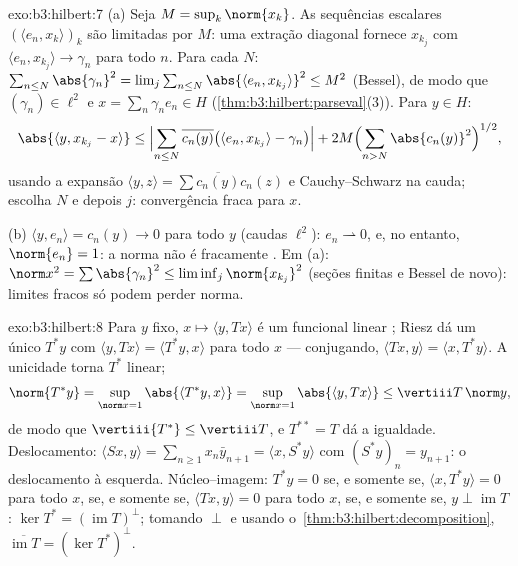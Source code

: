 \begin{solution}{exo:b3:hilbert:7}
(a) Seja $M = \sup_k\norm{x_k}$. As sequências escalares
$(\langle e_n, x_k\rangle)_k$ são limitadas por $M$: uma extração
diagonal fornece $x_{k_j}$ com $\langle e_n, x_{k_j}\rangle
\to \gamma_n$ para todo $n$. Para cada $N$: $\sum_{n\leq
N}\abs{\gamma_n}^2 = \lim_j\sum_{n\leq N}\abs{\langle e_n,
x_{k_j}\rangle}^2 \leq M^2$ (Bessel), de modo que $(\gamma_n) \in
\ell^2$ e $x = \sum_n\gamma_ne_n \in H$
(\cref{thm:b3:hilbert:parseval}(3)). Para $y \in H$:
\[
\abs{\langle y, x_{k_j} - x\rangle}
\leq \Bigl|\sum_{n\leq N}\overline{c_n(y)}\bigl(\langle e_n,
x_{k_j}\rangle - \gamma_n\bigr)\Bigr|
+ 2M\Bigl(\sum_{n>N}\abs{c_n(y)}^2\Bigr)^{1/2},
\]
usando a expansão $\langle y, z\rangle =
\sum\overline{c_n(y)}c_n(z)$ e Cauchy--Schwarz na cauda;
escolha $N$ e depois $j$: convergência fraca para $x$.

(b) $\langle y, e_n\rangle = c_n(y) \to 0$ para todo $y$
(caudas $\ell^2$): $e_n \rightharpoonup 0$, e, no entanto, $\norm{e_n} =
1$: a norma não é fracamente . Em (a): $\norm x^2 =
\sum\abs{\gamma_n}^2 \leq \liminf_j\norm{x_{k_j}}^2$ (seções
finitas e Bessel de novo): limites fracos só podem perder norma.
\end{solution}

\begin{solution}{exo:b3:hilbert:8}
Para $y$ fixo, $x \mapsto \langle y, Tx\rangle$ é um
funcional linear ; Riesz dá um único $T^*y$ com
$\langle y, Tx\rangle = \langle T^*y, x\rangle$ para todo $x$
--- conjugando, $\langle Tx, y\rangle = \langle x,
T^*y\rangle$. A unicidade torna $T^*$ linear;
\[
\norm{T^*y} = \sup_{\norm x = 1}\abs{\langle T^*y, x\rangle}
= \sup_{\norm x=1}\abs{\langle y, Tx\rangle}
\leq \vertiii T\,\norm y,
\]
de modo que $\vertiii{T^*} \leq \vertiii T$, e $T^{**} = T$ dá a
igualdade. Deslocamento: $\langle Sx, y\rangle = \sum_{n\geq1}
x_n\bar y_{n+1} = \langle x, S^*y\rangle$ com $(S^*y)_n =
y_{n+1}$: o deslocamento à esquerda. Núcleo--imagem: $T^*y = 0$ se, e somente se,
$\langle x, T^*y\rangle = 0$ para todo $x$, se, e somente se, $\langle Tx,
y\rangle = 0$ para todo $x$, se, e somente se, $y \perp \operatorname{im}T$:
$\ker T^* = (\operatorname{im}T)^\perp$; tomando $\perp$ e
usando o~\cref{thm:b3:hilbert:decomposition},
$\overline{\operatorname{im}T} = (\ker T^*)^\perp$.
\end{solution}

